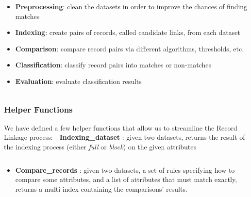 \documentclass{article}
\providecommand{\tightlist}{%
      \setlength{\itemsep}{0pt}\setlength{\parskip}{0pt}}
\begin{document}
\begin{itemize}
\tightlist
\item
  \textbf{Preprocessing}: clean the datasets in order to improve the
  chances of finding matches
\item
  \textbf{Indexing}: create pairs of records, called candidate links,
  from each dataset
\item
  \textbf{Comparison}: compare record pairs via different algorithms,
  thresholds, etc.
\item
  \textbf{Classification}: classify record pairs into matches or
  non-matches
\item
  \textbf{Evaluation}: evaluate classification results
\end{itemize}

    \begin{Verbatim}[commandchars=\\\{\}]

\end{Verbatim}

    \hypertarget{helper-functions}{%
\subsubsection{Helper Functions}\label{helper-functions}}

We have defined a few helper functions that allow us to streamline the
Record Linkage process: - \textbf{Indexing\_dataset} : given two
datasets, returns the result of the indexing process (either \emph{full}
or \emph{block}) on the given attributes

    \begin{Verbatim}[commandchars=\\\{\}]

\end{Verbatim}

    \begin{itemize}
\tightlist
\item
  \textbf{Compare\_records} : given two datasets, a set of rules
  specifying how to compare some attributes, and a list of attributes
  that must match exactly, returns a multi index containing the
  comparisons' results.
\end{itemize}

    \begin{Verbatim}[commandchars=\\\{\}]

\end{Verbatim}
\end{document}

